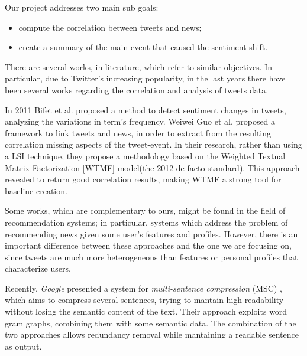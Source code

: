 Our project addresses two main sub goals:
\begin{itemize}
	\item compute the correlation between tweets and news;
	\item create a summary of the main event that caused the sentiment shift.
\end{itemize}


 
There are several works, in literature, which refer to similar objectives. In particular, due to Twitter’s increasing popularity, in the last years there have been several works regarding the correlation and analysis of tweets data. 
 
 
In 2011 Bifet et al.\cite{Bifet} proposed a method to detect sentiment changes in tweets, analyzing the variations in term's frequency. 
Weiwei Guo et al.\cite{LTN} proposed a framework to link tweets and news, in order to extract from the resulting correlation missing aspects of the tweet-event.
In their research, rather than using a LSI technique, they propose a methodology based on the Weighted Textual Matrix Factorization\cite{WTMF}
[WTMF] model(the 2012 de facto standard).
This approach revealed to return good correlation results, making WTMF a strong tool for baseline creation.

Some works, which are complementary to ours, might be found in the field of recommendation systems; in particular, systems which address the problem of recommending news given some user’s features and profiles.
However, there is an important difference between these approaches and the one we are focusing on, since tweets are much more heterogeneous than features or personal profiles that characterize users. 

Recently, \emph{Google} presented a system for \emph{multi-sentence compression} (MSC) \cite{MSC}, which aims
to compress several sentences, trying to mantain high readability without losing
the semantic content of the text. Their approach exploits word gram graphs,
combining them with some semantic data. The combination of the two approaches
allows redundancy removal while mantaining a readable sentence as output.


